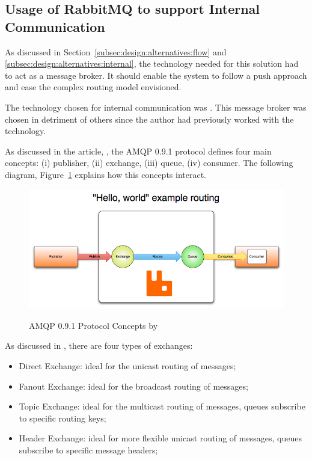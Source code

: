 \subsection{Usage of RabbitMQ to support Internal Communication}
\label{subsec:implementation:decisions:rabbitmq}

As discussed in Section~\ref{subsec:design:alternatives:flow} and \ref{subsec:design:alternatives:internal}, the technology needed for this solution had to act as a message broker. It should enable the system to follow a push approach and ease the complex routing model envisioned.

The technology chosen for internal communication was . This message broker was chosen in detriment of others since the author had previously worked with the technology.

As discussed in the article, , the \gls{AMQP} 0.9.1 protocol defines four main concepts: (i) publisher, (ii) exchange, (iii) queue, (iv) consumer. The following diagram, Figure~\ref{fig:implementation:decisions:rabbitmq} explains how this concepts interact.

\begin{figure}[H]
    \centering
    \resizebox{\columnwidth}{!}
    {
       \includegraphics{assets/figures/rabbitmq.png}
    }
    \caption[\gls{AMQP} 0.9.1 Protocol Concepts]{\gls{AMQP} 0.9.1 Protocol Concepts by \cite{rabbitmqexpl}}
    \label{fig:implementation:decisions:rabbitmq}
 \end{figure}

As discussed in , there are four types of exchanges:

\begin{itemize}
    \item Direct Exchange: ideal for the unicast routing of messages;
    \item Fanout Exchange: ideal for the broadcast routing of messages;
    \item Topic Exchange: ideal for the multicast routing of messages, queues subscribe to specific routing keys;
    \item Header Exchange: ideal for more flexible unicast routing of messages, queues subscribe to specific message headers;
\end{itemize}

